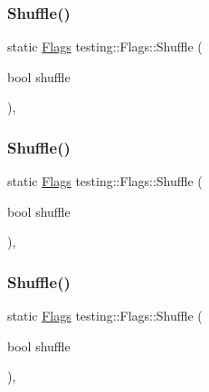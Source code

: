 \mbox{\label{structtesting_1_1_flags_a19ddbbaed61bda44a1940333b7c5a469}} 
\subsubsection{\texorpdfstring{Shuffle()}{Shuffle()}\hspace{0.1cm}{\footnotesize\ttfamily [1/3]}}
{\footnotesize\ttfamily static \mbox{\hyperlink{structtesting_1_1_flags}{Flags}} testing\+::\+Flags\+::\+Shuffle (\begin{DoxyParamCaption}\item[{bool}]{shuffle }\end{DoxyParamCaption})\hspace{0.3cm}{\ttfamily [inline]}, {\ttfamily [static]}}

\mbox{\label{structtesting_1_1_flags_a19ddbbaed61bda44a1940333b7c5a469}} 
\subsubsection{\texorpdfstring{Shuffle()}{Shuffle()}\hspace{0.1cm}{\footnotesize\ttfamily [2/3]}}
{\footnotesize\ttfamily static \mbox{\hyperlink{structtesting_1_1_flags}{Flags}} testing\+::\+Flags\+::\+Shuffle (\begin{DoxyParamCaption}\item[{bool}]{shuffle }\end{DoxyParamCaption})\hspace{0.3cm}{\ttfamily [inline]}, {\ttfamily [static]}}

\mbox{\label{structtesting_1_1_flags_a19ddbbaed61bda44a1940333b7c5a469}} 
\subsubsection{\texorpdfstring{Shuffle()}{Shuffle()}\hspace{0.1cm}{\footnotesize\ttfamily [3/3]}}
{\footnotesize\ttfamily static \mbox{\hyperlink{structtesting_1_1_flags}{Flags}} testing\+::\+Flags\+::\+Shuffle (\begin{DoxyParamCaption}\item[{bool}]{shuffle }\end{DoxyParamCaption})\hspace{0.3cm}{\ttfamily [inline]}, {\ttfamily [static]}}

